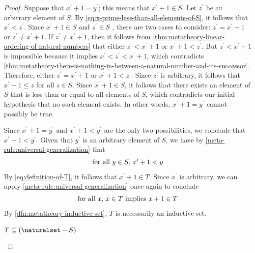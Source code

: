\begin{proof}
    \vspace{0.3cm}
    \noindent
    Suppose that \( x^{\prime} + 1 = y^{\prime} \); this means that \( x^{\prime} + 1 \in S \).
    Let \( z^{\prime} \) be an arbitrary element of \( S \).
    By \eqref{eq:x-prime-less-than-all-elements-of-S}, it follows that \( x^{\prime} < z^{\prime} \).
    Since \( x^{\prime} + 1 \in S \) and \( z^{\prime} \in S \) , there are two cases to consider: \( z^{\prime} = x^{\prime} + 1 \) or \( z^{\prime} \neq x^{\prime} + 1 \).
    If \( z^{\prime} \neq x^{\prime} + 1 \), then it follows from \cref{thm:metatheory-linear-ordering-of-natural-numbers} that either
    \( z^{\prime} < x^{\prime} + 1 \) or \( x^{\prime} + 1 < z^{\prime} \).
    But \( z^{\prime} < x^{\prime} + 1 \) is impossible because it implies \( x^{\prime} < z^{\prime} < x^{\prime} + 1 \),
    which contradicts \cref{thm:metatheory-there-is-nothing-in-between-a-natural-number-and-its-successor}.
    Therefore, either \( z^{\prime} = x^{\prime} + 1 \) or \( x^{\prime} + 1 < z^{\prime} \).
    Since \( z^{\prime} \) is arbitrary, it follows that \( x^{\prime} + 1 \leq z \) for all \( z \in S \). 
    Since \( x^{\prime} + 1 \in S \), it follows that there exists an element of \( S \) that is less than or equal to all elements of \( S \), which contradicts
    our initial hypothesis that no such element exists.
    In other words, \( x^{\prime} + 1 = y^{\prime} \) cannot possibly be true.

    \vspace{0.3cm}
    \noindent
    Since \( x^{\prime} + 1 = y^{\prime} \) and \( x^{\prime} + 1 < y^{\prime} \) are the only two possibilities, we conclude that
    \( x^{\prime} + 1 < y^{\prime} \).
    Given that \( y^{\prime} \) is an arbitrary element of \( S \), we have by \cref{meta-rule:universal-generalization} that
    \begin{equation*}
        \text{for all \( y \in S \), \( x^{\prime} + 1 < y \)}
    \end{equation*}
    By \eqref{eq:definition-of-T}, it follows that \( x^{\prime} + 1 \in T \).
    Since \( x^{\prime} \) is arbitrary, we can apply \cref{meta-rule:universal-generalization} once again to conclude
    \begin{equation*}
        \text{for all \( x \), \( x \in T \) implies \( x + 1 \in T \)}
    \end{equation*}
    By \cref{dfn:metatheory-inductive-set}, \( T \) is necessarily an inductive set.

    \begin{claim}
         \label{claim:T-is-the-subset-of-N-minus-S}
        \( T \subseteq \mleft( \naturalset - S \mright) \)
    \end{claim}


\end{proof}
